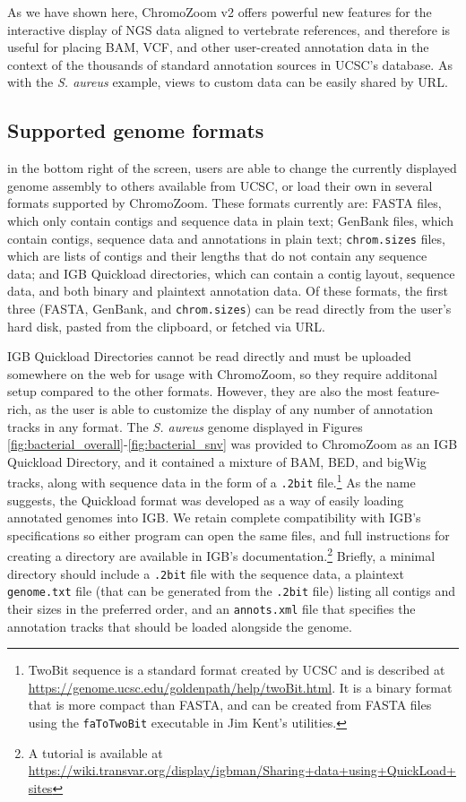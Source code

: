 As we have shown here, ChromoZoom v2 offers powerful new features for the interactive display of NGS data aligned to vertebrate references, and therefore is useful for placing BAM, VCF, and other user-created annotation data in the context of the thousands of standard annotation sources in UCSC's database. As with the \emph{S. aureus} example, views to custom data can be easily shared by URL. %

\subsection{Supported genome formats}

 in the bottom right of the screen, users are able to change the currently displayed genome assembly to others available from UCSC, or load their own in several formats supported by ChromoZoom. These formats currently are: FASTA files, which only contain contigs and sequence data in plain text; GenBank files, which contain contigs, sequence data and annotations in plain text; \texttt{chrom.sizes} files, which are lists of contigs and their lengths that do not contain any sequence data; and IGB Quickload directories, which can contain a contig layout, sequence data, and both binary and plaintext annotation data. Of these formats, the first three (FASTA, GenBank, and \texttt{chrom.sizes}) can be read directly from the user's hard disk, pasted from the clipboard, or fetched via URL.

IGB Quickload Directories cannot be read directly and must be uploaded somewhere on the web for usage with ChromoZoom, so they require additonal setup compared to the other formats. However, they are also the most feature-rich, as the user is able to customize the display of any number of annotation tracks in any format. The \emph{S. aureus} genome displayed in Figures \ref{fig:bacterial_overall}-\ref{fig:bacterial_snv} was provided to ChromoZoom as an IGB Quickload Directory, and it contained a mixture of BAM, BED, and bigWig tracks, along with sequence data in the form of a \texttt{.2bit} file.\footnote{TwoBit sequence is a standard format created by UCSC and is described at \url{https://genome.ucsc.edu/goldenpath/help/twoBit.html}. It is a binary format that is more compact than FASTA, and can be created from FASTA files using the \texttt{faToTwoBit} executable in Jim Kent's utilities.} As the name suggests, the Quickload format was developed as a way of easily loading annotated genomes into IGB. We retain complete compatibility with IGB's specifications so either program can open the same files, and full instructions for creating a directory are available in IGB's documentation.\footnote{A tutorial is available at \url{https://wiki.transvar.org/display/igbman/Sharing+data+using+QuickLoad+sites}} Briefly, a minimal directory should include a \texttt{.2bit} file with the sequence data, a plaintext \texttt{genome.txt} file (that can be generated from the \texttt{.2bit} file) listing all contigs and their sizes in the preferred order, and an \texttt{annots.xml} file that specifies the annotation tracks that should be loaded alongside the genome.

